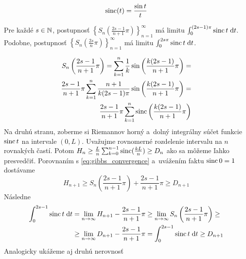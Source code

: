\begin{definicia}
    \begin{equation*}
        \operatorname{sinc}(t) = \frac{\sin t}{t}
    \end{equation*}
\end{definicia}

\begin{veta}
Pre každé $s\in\mathbb{N}$, postupnosť
$\left\{S_n\left( \frac{2s-1}{n+1}\pi\right)\right\}_{n=1}^{\infty}$
má limitu $\int_0^{(2s-1)\pi} \operatorname{sinc} t \; \mathrm{d} t$. Podobne, postupnosť
$\left\{S_n\left( \frac{2s}{n}\pi\right)\right\}_{n=1}^{\infty}$
má limitu $\int_0^{2s\pi} \operatorname{sinc} t \; \mathrm{d} t$.
\end{veta}

\begin{dokaz}
    \begin{equation}
        \begin{split}
        S_n\left(\frac{2s-1}{n+1}\pi\right) =
            \sum_{k=1}^n \frac{1}{k}
            \sin\left(\frac{k(2s-1)}{n+1}\pi\right) = \\
         \frac{2s-1}{n+1}\pi    
            \sum_{k=1}^n \frac{n+1}{k(2s-1)\pi}
            \sin\left(\frac{k(2s-1)}{n+1}\pi\right) = \\
         \frac{2s-1}{n+1}\pi    
            \sum_{k=1}^n \operatorname{sinc}\left( \frac{k(2s-1)}{n+1} \pi \right)            
        \end{split}
        \label{eq:gibbs_convergence}
    \end{equation}
    Na druhú stranu, zoberme si Riemannov horný a~dolný
    integrálny súčet funkcie $\operatorname{sinc} t$ na intervale $(0,L)$.
    Uvažujme rovnomerné rozdelenie intervalu na $n$ rovnakých častí.
    Potom $H_n \ge \frac{L}{n} \sum_{k=0}^{n-1} \operatorname{sinc}(\frac{k L}{n}) \ge D_n$
    ako sa môžeme ľahko presvedčiť.
    Porovnaním s \eqref{eq:gibbs_convergence} a~uvážením faktu
    $\operatorname{sinc} 0 =1$ dostávame
    \begin{equation*}
        H_{n+1} \ge S_n\left(\frac{2s-1}{n+1}\pi\right) +
        \frac{2s-1}{n+1}\pi \ge D_{n+1}
    \end{equation*}
    Následne
    \begin{equation*}
        \begin{split}
       \int_0^{2s-1} \operatorname{sinc} t \; \mathrm{d} t &= 
       \lim_{n \rightarrow \infty} H_{n+1} - \frac{2s-1}{n+1}\pi \ge 
       \lim_{n \rightarrow \infty} S_n\left(\frac{2s-1}{n+1}\pi\right) \ge \\
       &\ge
       \lim_{n \rightarrow \infty} D_{n+1} - \frac{2s-1}{n+1}\pi =
       \int_0^{2s-1} \operatorname{sinc} t \; \mathrm{d} t                     
        \ge D_{n+1}
      \end{split}
    \end{equation*}
    Analogicky ukážeme aj druhú nerovnosť    
\end{dokaz}

